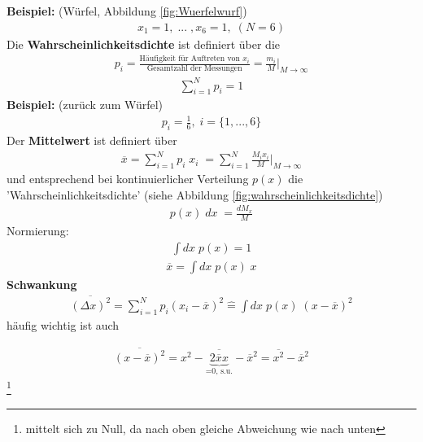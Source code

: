 \documentclass[12pt]{article}
\begin{document}
\textbf{Beispiel:} (Würfel, Abbildung \ref{fig:Wuerfelwurf})  \\
\begin{align*}
x_1 = 1 , \; ... \; ,  x_6 = 1 , \; (N=6)
\end{align*}
Die \textbf{Wahrscheinlichkeitsdichte} ist definiert über die
\begin{align}
p_i = \frac{\mbox{Häufigkeit für Auftreten von } x_i}{\mbox{Gesamtzahl der Messungen}} = \frac{m_i}{M} \biggr\vert_{M \to \infty}
\end{align}
\begin{align*}
\sum_{i=1}^N p_i = 1
\end{align*}
\textbf{Beispiel:} (zurück zum Würfel)
\begin{align*}
p_i = \frac{1}{6}, \; i=\{1,...,6\}
\end{align*}
Der \textbf{Mittelwert} ist definiert über
\begin{align}
\overline{x} = \sum_{i=1}^N p_i \; x_i \; = \sum_{i=1}^N \frac{M_i x_i}{M} \biggr\vert_{M \to \infty}
\end{align}
und entsprechend bei kontinuierlicher Verteilung $p(x)$ die 'Wahrscheinlichkeitsdichte' (siehe Abbildung \ref{fig:wahrscheinlichkeitsdichte})
\begin{align}
p(x) \; dx \; = \frac{dM_x}{M}
\end{align}
Normierung:
\begin{align}
\int dx \; p(x) = 1 
\end{align}
\begin{align}
\overline{x}= \int dx \; p(x) \; x
\end{align}
\textbf{Schwankung}
\begin{align}
\overline{(\Delta x)^2} = \sum_{i=1}^N p_i \left( x_i - \overline{x} \right) ^2 \widehat{=} \int dx \; p(x) \; (x- \overline{x})^2
\end{align}
häufig wichtig ist auch

\begin{align}
\overline{(x-\overline{x})^2} = \overline{x^2 - \underbrace{2 \overline{x} x}_\text{=0, s.u.} - \overline{x}^2} = \overline{x^2} - \overline{x}^2
\end{align}  \footnote{mittelt sich zu Null, da nach oben gleiche Abweichung wie nach unten} \\
\end{document}
